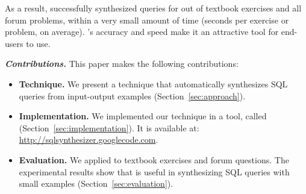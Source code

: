 As a result, \ourtool successfully synthesized queries
for \solexnum out of \exnum textbook exercises and
all \pnum forum problems, within a very small amount of time
(\avgsucctime seconds per exercise or problem, on average).
\ourtool's accuracy and speed make it an attractive
tool for end-users to use.%


\vspace{1mm}
\noindent\textbf{\textit{Contributions.}}
This paper makes the following contributions:

\begin{itemize}

\item \textbf{Technique.} We present a technique that automatically
synthesizes SQL queries from input-output examples
(Section~\ref{sec:approach}).

\item \textbf{Implementation.} We implemented our technique in a
tool, called \ourtool (Section~\ref{sec:implementation}). It is
available at: \url{http://sqlsynthesizer.googlecode.com}.

\item \textbf{Evaluation.} We applied \ourtool
to \exnum textbook exercises and \pnum 
forum questions.
The experimental results show that \ourtool is
useful in synthesizing SQL queries with
small examples (Section~\ref{sec:evaluation}).
\end{itemize}
